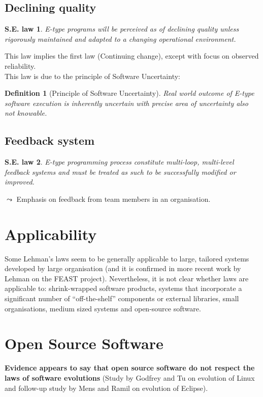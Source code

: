\documentclass[a4paper,11pt]{report}
\newtheorem{definition}{Definition}
\newtheorem{law}{S.E. law}
\begin{document}
\subsection{Declining quality}
\begin{law}
E-type programs will be perceived as of declining quality unless rigorously
maintained and adapted to a changing operational environment.
\end{law}

This law implies the first law (Continuing change), except with focus on
observed reliability.\\

This law is due to the principle of Software Uncertainty:
\begin{definition}[Principle of Software Uncertainty]
Real world outcome of E-type software execution is inherently uncertain with
precise area of uncertainty also not knowable.
\end{definition}

\subsection{Feedback system}
\begin{law}
E-type programming process constitute multi-loop, multi-level feedback
systems and must be treated as such to be successfully modified or improved.
\end{law}

$\leadsto$ Emphasis on feedback from team members in an organisation.

\section{Applicability}
Some Lehman's laws seem to be generally applicable to large, tailored systems
developed by large organisation (and it is confirmed in more recent work by
Lehman on the FEAST project). Nevertheless, it is not clear whether laws are
applicable to: shrink-wrapped software products, systems that incorporate a
significant number of ``off-the-shelf'' components or external libraries, small
organisations, medium sized systems and open-source software.

\section{Open Source Software}
\textbf{Evidence appears to say that open source software do not respect the
laws of software evolutions} (Study by Godfrey and Tu on evolution of Linux and
follow-up study by Mens and Ramil on evolution of Eclipse).
\end{document}
